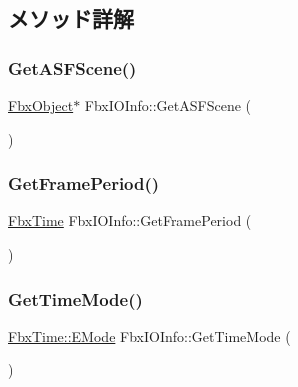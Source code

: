 \subsection{メソッド詳解}
\mbox{\label{class_fbx_i_o_info_ad55af50ad7d761db82760482bff22171}} 
\subsubsection{\texorpdfstring{Get\+A\+S\+F\+Scene()}{GetASFScene()}}
{\footnotesize\ttfamily \hyperlink{class_fbx_object}{Fbx\+Object}$\ast$ Fbx\+I\+O\+Info\+::\+Get\+A\+S\+F\+Scene (\begin{DoxyParamCaption}{ }\end{DoxyParamCaption})}

\mbox{\label{class_fbx_i_o_info_a8b6516f2703015a23c0d79931dd01c45}} 
\subsubsection{\texorpdfstring{Get\+Frame\+Period()}{GetFramePeriod()}}
{\footnotesize\ttfamily \hyperlink{class_fbx_time}{Fbx\+Time} Fbx\+I\+O\+Info\+::\+Get\+Frame\+Period (\begin{DoxyParamCaption}{ }\end{DoxyParamCaption})}

\mbox{\label{class_fbx_i_o_info_afe331ddda425067f8577e78c0c955bbb}} 
\subsubsection{\texorpdfstring{Get\+Time\+Mode()}{GetTimeMode()}}
{\footnotesize\ttfamily \hyperlink{class_fbx_time_acc529b00a0e8d4c3da3702449ca93031}{Fbx\+Time\+::\+E\+Mode} Fbx\+I\+O\+Info\+::\+Get\+Time\+Mode (\begin{DoxyParamCaption}{ }\end{DoxyParamCaption})}

